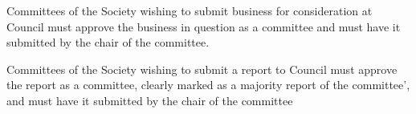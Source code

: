 \begin{longenum}[ label*=\thesubsection.\arabic*., align=left]
	\item Committees of the Society wishing to submit business for consideration at Council must approve the business in question as a committee and must have it submitted by the chair of the committee.
	\begin{longenum}[ label*=\arabic*., align=left]
		\item Committees of the Society wishing to submit a report to Council must approve the report as a committee, clearly marked as a majority report of the committee', and must have it submitted by the chair of the committee


\end{longenum}
\end{longenum}

